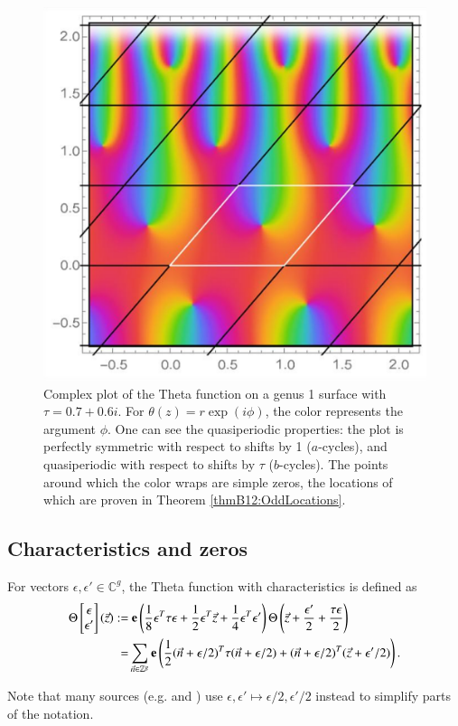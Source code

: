 \begin{figure}
    \center
    \includegraphics{assets/genus1theta.png}
    \caption{Complex plot of the Theta function on a genus 1 surface with $\tau = 0.7+0.6i$. For $\theta(z)=r\exp(i\phi)$, the color represents the argument $\phi$. One can see the quasiperiodic properties: the plot is perfectly symmetric with respect to shifts by 1 ($a$-cycles), and quasiperiodic with respect to shifts by $\tau$ ($b$-cycles). The points around which the color wraps are simple zeros, the locations of which are proven in Theorem \ref{thmB12:OddLocations}.}
    \label{figB12:Genus1Theta}
\end{figure}

\subsection{Characteristics and zeros}
\begin{definition}
    For vectors $\epsilon,\epsilon' \in \mathbb C^g$, the Theta function with characteristics is defined as
    \begin{align}
        \Theta\begin{bmatrix} \epsilon \\  \epsilon'\end{bmatrix}(\vec z) :=& \ 
        \bolde\left(\frac{1}{8}\epsilon^T \tau \epsilon + \frac{1}{2}\epsilon^T \vec z + \frac{1}{4}\epsilon^T  \epsilon'\right)
        \Theta\left(\vec z + \frac{\epsilon'}{2}+\frac{\tau\epsilon}{2}\right)
       \\ =& \sum_{\vec n \in \mathbb Z^g} \bolde\left(\frac{1}{2} (\vec n+\epsilon/2)^T \tau (\vec n+\epsilon/2) + (\vec n+\epsilon/2)^T (\vec z+\epsilon'/2)\right).
    \end{align}

    Note that many sources (e.g. \cite{Cha22} and \cite{ComputationalSchottky}) use $\epsilon,\epsilon' \mapsto \epsilon/2,\epsilon'/2$ instead to simplify parts of the notation.
\end{definition}


